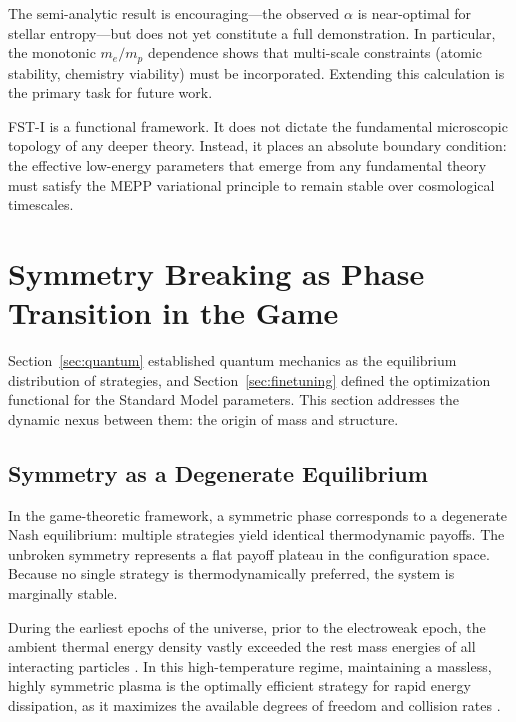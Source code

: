 \documentclass[12pt,a4paper]{article}
\theoremstyle{remark}
\begin{document}
The semi-analytic result is encouraging---the observed $\alpha$ is near-optimal for stellar entropy---but does not yet constitute a full demonstration. In particular, the monotonic $m_e/m_p$ dependence shows that multi-scale constraints (atomic stability, chemistry viability) must be incorporated. Extending this calculation is the primary task for future work.

FST-I is a functional framework. It does not dictate the fundamental microscopic topology of any deeper theory. Instead, it places an absolute boundary condition: the effective low-energy parameters that emerge from any fundamental theory must satisfy the MEPP variational principle to remain stable over cosmological timescales.

\section{Symmetry Breaking as Phase Transition in the Game}
\label{sec:symmetry}

Section~\ref{sec:quantum} established quantum mechanics as the equilibrium distribution of strategies, and Section~\ref{sec:finetuning} defined the optimization functional for the Standard Model parameters. This section addresses the dynamic nexus between them: the origin of mass and structure.

\subsection{Symmetry as a Degenerate Equilibrium}

In the game-theoretic framework, a symmetric phase corresponds to a degenerate Nash equilibrium: multiple strategies yield identical thermodynamic payoffs. The unbroken symmetry represents a flat payoff plateau in the configuration space. Because no single strategy is thermodynamically preferred, the system is marginally stable.

During the earliest epochs of the universe, prior to the electroweak epoch, the ambient thermal energy density vastly exceeded the rest mass energies of all interacting particles \citep{HiggsVEV}. In this high-temperature regime, maintaining a massless, highly symmetric plasma is the optimally efficient strategy for rapid energy dissipation, as it maximizes the available degrees of freedom and collision rates \citep{HiggsVEV2024}.
\end{document}
